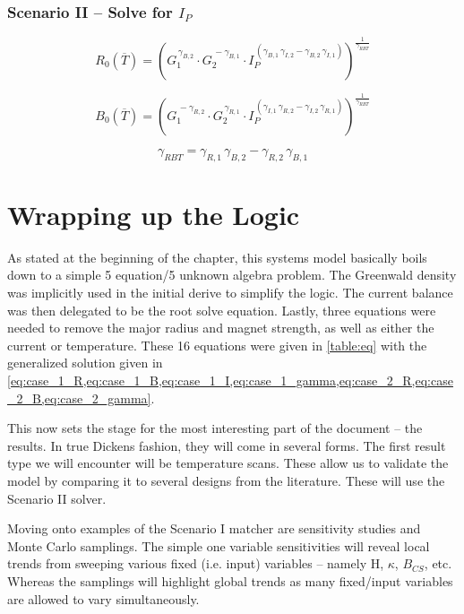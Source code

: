 \subsubsection{Scenario II -- Solve for $I_P$}

\begin{equation}
	\label{eq:case_2_R}
	R_0( \overline T) = \left( 
	G_1 ^ {  \, \gamma_{B,2} } \cdot 
	G_2 ^ {  \, -\gamma_{B,1} } \cdot 
	I_P ^ {  \, ( \gamma_{B,1} \, \gamma_{I,2} - \gamma_{B,2} \, \gamma_{I,1} ) }\right)^{ \frac{1}{\gamma_{RBT}} }
\end{equation}

\begin{equation}
	\label{eq:case_2_B}
	B_0( \overline T) = \left( 
	G_1 ^ {  \, -\gamma_{R,2} } \cdot 
	G_2 ^ {  \, \gamma_{R,1} } \cdot 
	I_P ^ {  \, ( \gamma_{I,1} \, \gamma_{R,2} - \gamma_{I,2} \, \gamma_{R,1} ) }\right)^{ \frac{1}{\gamma_{RBT}} }
\end{equation}

\begin{equation}
	\label{eq:case_2_gamma}
	\gamma_{RBT} = \gamma_{R,1} \, \gamma_{B,2} - \gamma_{R,2} \, \gamma_{B,1}
\end{equation}

\section{Wrapping up the Logic} 

As stated at the beginning of the chapter, this systems model basically boils down to a simple 5 equation/5 unknown algebra problem. The Greenwald density was implicitly used in the initial derive to simplify the logic. The current balance was then delegated to be the root solve equation. Lastly, three equations were needed to remove the major radius and magnet strength, as well as either the current or temperature. These 16 equations were given in \cref{table:eq} with the generalized solution given in \cref{eq:case_1_R,eq:case_1_B,eq:case_1_I,eq:case_1_gamma,eq:case_2_R,eq:case_2_B,eq:case_2_gamma}.

This now sets the stage for the most interesting part of the document -- the results. In true Dickens fashion, they will come in several forms. The first result type we will encounter will be temperature scans. These allow us to validate the model by comparing it to several designs from the literature. These will use the Scenario II solver.

Moving onto examples of the Scenario I matcher are sensitivity studies and Monte Carlo samplings. The simple one variable sensitivities will reveal local trends from sweeping various fixed (i.e. input) variables -- namely H, $\kappa$, $B_{CS}$, etc. Whereas the samplings will highlight global trends as many fixed/input variables are allowed to vary simultaneously.

